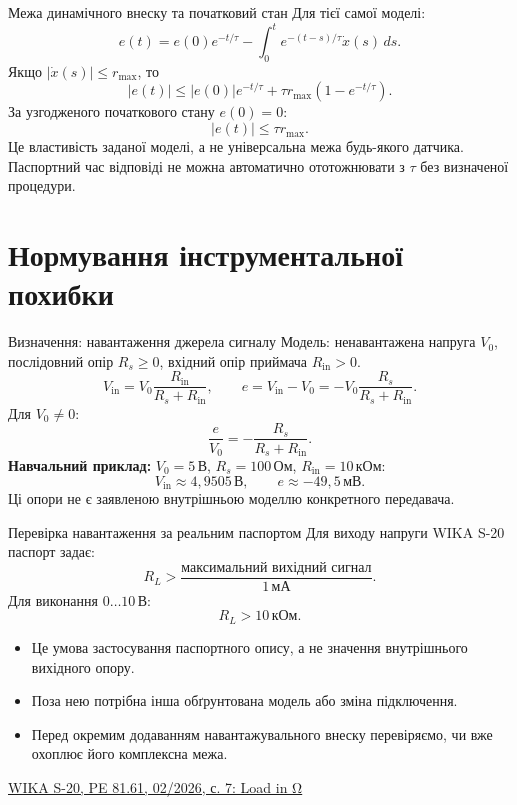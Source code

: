 \documentclass[aspectratio=169,11pt]{beamer}
\newcommand{\unit}[1]{\,\text{#1}}
\newcommand{\src}[2]{\par\vfill{\tiny\href{#1}{#2}}}
\begin{document}
\begin{frame}{Межа динамічного внеску та початковий стан}
Для тієї самої моделі:
\[
e(t)=e(0)e^{-t/\tau}-\int_0^t e^{-(t-s)/\tau}\dot x(s)\,ds.
\]
Якщо $|\dot x(s)|\le r_{\max}$, то
\[
|e(t)|\le |e(0)|e^{-t/\tau}+\tau r_{\max}(1-e^{-t/\tau}).
\]
За узгодженого початкового стану $e(0)=0$:
\[
|e(t)|\le\tau r_{\max}.
\]
Це властивість заданої моделі, а не універсальна межа будь-якого датчика. Паспортний час відповіді не можна автоматично ототожнювати з $\tau$ без визначеної процедури.
\end{frame}

\section{Нормування інструментальної похибки}
\begin{frame}{Визначення: навантаження джерела сигналу}
Модель: ненавантажена напруга $V_0$, послідовний опір $R_s\ge0$, вхідний опір приймача $R_{\mathrm{in}}>0$.
\[
V_{\mathrm{in}}=V_0\frac{R_{\mathrm{in}}}{R_s+R_{\mathrm{in}}},\qquad
e=V_{\mathrm{in}}-V_0=-V_0\frac{R_s}{R_s+R_{\mathrm{in}}}.
\]
Для $V_0\ne0$:
\[
\frac e{V_0}=-\frac{R_s}{R_s+R_{\mathrm{in}}}.
\]
\textbf{Навчальний приклад:} $V_0=5\unit{В}$, $R_s=100\unit{Ом}$, $R_{\mathrm{in}}=10\unit{кОм}$:
\[
V_{\mathrm{in}}\approx4{,}9505\unit{В},\qquad e\approx-49{,}5\unit{мВ}.
\]
Ці опори не є заявленою внутрішньою моделлю конкретного передавача.
\end{frame}

\begin{frame}{Перевірка навантаження за реальним паспортом}
Для виходу напруги WIKA S-20 паспорт задає:
\[
R_L>\frac{\text{максимальний вихідний сигнал}}{1\unit{мА}}.
\]
Для виконання $0\ldots10\unit{В}$:
\[
R_L>10\unit{кОм}.
\]
\begin{itemize}
\item Це умова застосування паспортного опису, а не значення внутрішнього вихідного опору.
\item Поза нею потрібна інша обґрунтована модель або зміна підключення.
\item Перед окремим додаванням навантажувального внеску перевіряємо, чи вже охоплює його комплексна межа.
\end{itemize}
\src{https://www.wika.com/media/Data-sheets/Pressure/Pressure-sensors/ds_pe8161_en_co.pdf}{WIKA S-20, PE 81.61, 02/2026, с. 7: Load in Ω}
\end{frame}
\end{document}
